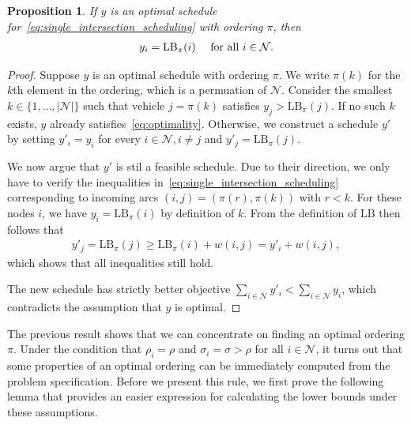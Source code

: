 \documentclass[a4paper]{article}
\theoremstyle{definition}
\theoremstyle{plain}
\newtheorem{proposition}{Proposition}
\begin{document}
\begin{proposition}\label{prop:active-schedule}
  If $y$ is an optimal schedule
  for~\eqref{eq:single_intersection_scheduling} with ordering $\pi$, then
  \begin{align}
    \label{eq:optimality}
    y_{i} = \text{\upshape LB}_{\pi}(i) \quad \text{ for all } i \in \mathcal{N} .
  \end{align}
\end{proposition}
\begin{proof}
  Suppose $y$ is an optimal schedule with ordering $\pi$. We write $\pi(k)$ for
  the $k$th element in the ordering, which is a permuation of $\mathcal{N}$.
  Consider the smallest $k \in \{1, \dots, |\mathcal{N}|\}$ such that vehicle
  $j = \pi(k)$ satisfies $y_{j} > \text{LB}_\pi(j)$. If no such $k$ exists, $y$
  already satisfies~\eqref{eq:optimality}. Otherwise, we construct a schedule
  $y'$ by setting $y'_{i} = y_{i}$ for every $i \in \mathcal{N}, i \neq j$ and
  $y'_{j} = \text{LB}_\pi(j)$.

  We now argue that $y'$ is stil a feasible schedule. Due to their direction, we
  only have to verify the inequalities
  in~\eqref{eq:single_intersection_scheduling} corresponding to incoming arcs
  $(i, j) = (\pi(r), \pi(k))$ with $r < k$. For these nodes $i$, we have
  $y_{i} = \text{LB}_\pi(i)$ by definition of $k$. From the definition of
  $\text{LB}$ then follows that
  \begin{align*}
    y'_{j} = \text{LB}_\pi(j) \geq \text{LB}_\pi(i) + w(i,j) = y'_{i} + w(i,j) ,
  \end{align*}
  which shows that all inequalities still hold.

  The new schedule has strictly better objective
  $\sum_{i \in \mathcal{N}} y'_{i} < \sum_{i \in \mathcal{N}} y_{i}$, which
  contradicts the assumption that $y$ is optimal.
\end{proof}


The previous result shows that we can concentrate on finding an optimal ordering
$\pi$. Under the condition that $\rho_{i} = \rho$ and $\sigma_{i} = \sigma > \rho$ for all
$i \in \mathcal{N}$, it turns out that some properties of an optimal ordering can
be immediately computed from the problem specification.
%
Before we present this rule, we first prove the following lemma that provides an
easier expression for calculating the lower bounds under these assumptions.
\end{document}
